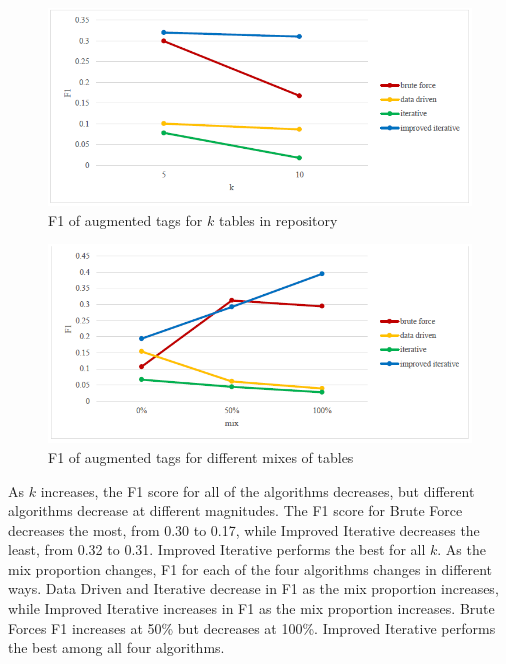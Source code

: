 \begin{figure}
  \centering
  \includegraphics[width=5in]{figures/f1-of-augmented-tags-for-k-tables-in-repository.png}
  \caption{F1 of augmented tags for $k$ tables in repository}
  \label{fig:f1-of-augmented-tags-for-k-tables-in-repository}
\end{figure}

\begin{figure}
  \centering
  \includegraphics[width=5in]{figures/f1-of-augmented-tags-for-different-mixes-of-tables.png}
  \caption{F1 of augmented tags for different mixes of tables}
  \label{fig:f1-of-augmented-tags-for-different-mixes-of-tables}
\end{figure}

As $k$ increases, the F1 score for all of the algorithms decreases, but different algorithms decrease at different magnitudes. The F1 score for Brute Force decreases the most, from 0.30 to 0.17, while Improved Iterative decreases the least, from 0.32 to 0.31. Improved Iterative performs the best for all $k$. As the mix proportion changes, F1 for each of the four algorithms changes in different ways. Data Driven and Iterative decrease in F1 as the mix proportion increases, while Improved Iterative increases in F1 as the mix proportion increases. Brute Forces F1 increases at 50\% but decreases at 100\%. Improved Iterative performs the best among all four algorithms.

